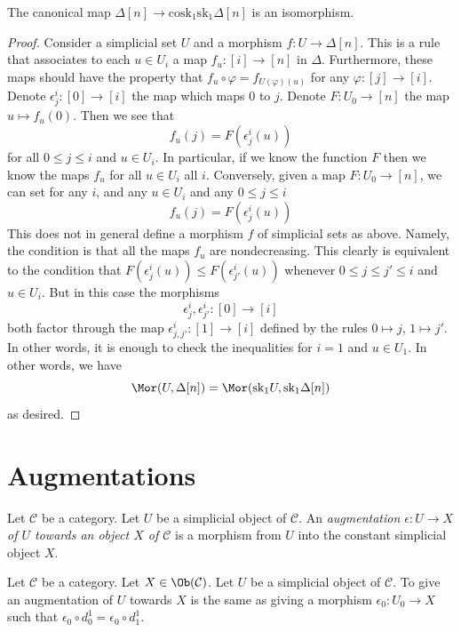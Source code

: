 \begin{lemma}
\label{lemma-simplex-cosk}
The canonical map
$\Delta[n] \to \text{cosk}_1 \text{sk}_1 \Delta[n]$
is an isomorphism.
\end{lemma}

\begin{proof}
Consider a simplicial set $U$ and a morphism
$f : U \to \Delta[n]$. This is a rule that associates
to each $u \in U_i$ a map $f_u : [i] \to [n]$ in $\Delta$.
Furthermore, these maps should have the property that
$f_u \circ \varphi = f_{U(\varphi)(u)}$ for any
$\varphi : [j] \to [i]$. Denote $\epsilon^i_j : [0] \to [i]$
the map which maps $0$ to $j$. Denote $F : U_0 \to [n]$
the map $u \mapsto f_u(0)$. Then we see that
$$
f_u(j) = F(\epsilon^i_j(u))
$$
for all $0 \leq j \leq i$ and $u \in U_i$.
In particular, if we know the function $F$
then we know the maps $f_u$ for all $u\in U_i$ all $i$.
Conversely, given a map $F : U_0 \to [n]$,
we can set for any $i$, and any $u \in U_i$
and any $0 \leq j \leq i$
$$
f_u(j) = F(\epsilon^i_j(u))
$$
This does not in general define a morphism $f$ of simplicial sets
as above. Namely, the condition is that all the maps $f_u$ are
nondecreasing. This clearly is equivalent to the condition
that $F(\epsilon^i_j(u)) \leq F(\epsilon^i_{j'}(u))$
whenever $0 \leq j \leq j' \leq i$ and $u \in U_i$. But in this
case the morphisms
$$
\epsilon^i_j, \epsilon^i_{j'} : [0] \to [i]
$$
both factor through the map
$\epsilon^i_{j, j'} : [1] \to [i]$ defined by the rules
$0 \mapsto j$, $1 \mapsto j'$.
In other words, it is enough to check the inequalities for
$i = 1$ and $u \in U_1$. In other words, we have
$$
\Mor(U, \Delta[n])
=
\Mor(\text{sk}_1 U, \text{sk}_1 \Delta[n])
$$
as desired.
\end{proof}



\section{Augmentations}
\label{section-augmentation}

\begin{definition}
\label{definition-augmentation}
Let $\mathcal{C}$ be a category.
Let $U$ be a simplicial object of $\mathcal{C}$.
An {\it augmentation $\epsilon : U \to X$ of
$U$ towards an object $X$ of $\mathcal{C}$}
is a morphism from $U$ into the constant simplicial
object $X$.
\end{definition}

\begin{lemma}
\label{lemma-augmentation-howto}
Let $\mathcal{C}$ be a category.
Let $X \in \Ob(\mathcal{C})$.
Let $U$ be a simplicial object of $\mathcal{C}$.
To give an augmentation of $U$ towards $X$ is
the same as giving a morphism $\epsilon_0 : U_0 \to X$
such that $\epsilon_0 \circ d^1_0 = \epsilon_0 \circ d^1_1$.
\end{lemma}

